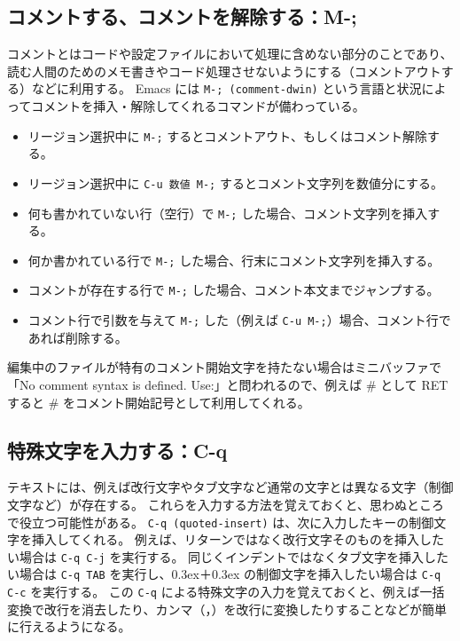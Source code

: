 \subsection{コメントする、コメントを解除する：M-;}
コメントとはコードや設定ファイルにおいて処理に含めない部分のことであり、読む人間のためのメモ書きやコード処理させないようにする（コメントアウトする）などに利用する。
Emacs には \texttt{M-; (comment-dwin)} という言語と状況によってコメントを挿入・解除してくれるコマンドが備わっている。
\begin{itemize}\setlength{\leftskip}{-1.00zw}%
\item リージョン選択中に \texttt{M-;} するとコメントアウト、もしくはコメント解除する。
\item リージョン選択中に \texttt{C-u 数値 M-;} するとコメント文字列を数値分にする。
\item 何も書かれていない行（空行）で \texttt{M-;} した場合、コメント文字列を挿入する。
\item 何か書かれている行で \texttt{M-;} した場合、行末にコメント文字列を挿入する。
\item コメントが存在する行で \texttt{M-;} した場合、コメント本文までジャンプする。
\item コメント行で引数を与えて \texttt{M-;} した（例えば \texttt{C-u M-;}）場合、コメント行であれば削除する。
\end{itemize}
編集中のファイルが特有のコメント開始文字を持たない場合はミニバッファで「No comment syntax is defined. Use:」と問われるので、例えば \# として RET すると \# をコメント開始記号として利用してくれる。
\subsection{特殊文字を入力する：C-q}
テキストには、例えば改行文字やタブ文字など通常の文字とは異なる文字（制御文字など）が存在する。
これらを入力する方法を覚えておくと、思わぬところで役立つ可能性がある。
\texttt{C-q (quoted-insert)} は、次に入力したキーの制御文字を挿入してくれる。
例えば、リターンではなく改行文字そのものを挿入したい場合は \texttt{C-q C-j} を実行する。
同じくインデントではなくタブ文字を挿入したい場合は \texttt{C-q TAB} を実行し、\raise0.3ex\hbox{}＋\raise0.3ex\hbox{} の制御文字を挿入したい場合は \texttt{C-q C-c} を実行する。
この \texttt{C-q} による特殊文字の入力を覚えておくと、例えば一括変換で改行を消去したり、カンマ（，）を改行に変換したりすることなどが簡単に行えるようになる。
